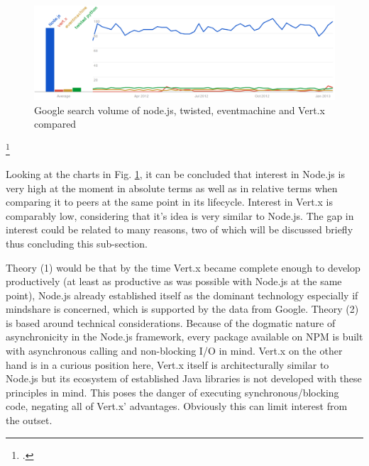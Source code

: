 \begin{figure}[hbtp]
\centering
\includegraphics[width=\textwidth]{img/googletrend_all.png}
\caption[Google search volume of node.js, twisted, eventmachine and Vert.x compared]{Google search volume of node.js, twisted, eventmachine and Vert.x compared}
\label{img_googletrend_all}
\end{figure}
\footcitetext[Cf.][]{g_trends}

Looking at the charts in Fig. \ref{img_googletrend_all}, it can be
concluded that interest in Node.js is very high at the moment in absolute terms as well
as in relative terms when comparing it to peers at the same point in its lifecycle.
Interest in Vert.x is comparably low, considering that it's idea is very similar to Node.js.
The gap in interest could be related to many reasons, two of which will be discussed briefly thus concluding this sub-section.

Theory (1) would be that by the time Vert.x became complete enough to develop
productively (at least as productive as was possible with Node.js at the same
point), Node.js already established itself as the dominant technology especially if
mindshare is concerned, which is supported by the data from Google.
Theory (2) is based around technical considerations. Because of the dogmatic
nature of asynchronicity in the Node.js framework, every package available on
NPM is built with asynchronous calling
and non-blocking I/O in mind. Vert.x on the
other hand is in a curious position here, Vert.x itself is architecturally
similar to Node.js but its ecosystem of established Java libraries is not developed
with these principles in mind. This poses the danger of executing
synchronous/blocking code, negating all of Vert.x' advantages. Obviously this
can limit interest from the outset.

